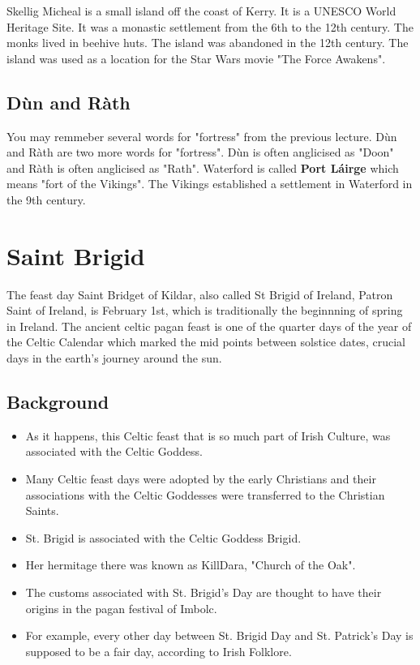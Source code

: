 \documentclass[a4paper]{article}
\begin{document}
Skellig Micheal is a small island off the coast of Kerry. It is a UNESCO World Heritage Site. It was a monastic settlement from the 6th to the 12th century. The monks lived in beehive huts. The island was abandoned in the 12th century. The island was used as a location for the Star Wars movie "The Force Awakens".

\subsection{Dùn and Ràth}

You may remmeber several words for "fortress" from the previous lecture.
Dùn and Ràth are two more words for "fortress". Dùn is often anglicised as "Doon" 
and Ràth is often anglicised as "Rath". Waterford is called \textbf{Port Láirge} which means "fort of the Vikings". The Vikings established a settlement in Waterford in the 9th century.

\section{Saint Brigid}

The feast day Saint Bridget of Kildar, also called St Brigid of Ireland, Patron Saint of Ireland, is February 1st, which is traditionally the beginnning of spring in Ireland.
The ancient celtic pagan feast is one of the quarter days of the year of the Celtic Calendar which marked the mid points between solstice dates, crucial days in the earth's journey around the sun.

\subsection{Background}

\begin{itemize}
    \item As it happens, this Celtic feast that is so much part of Irish Culture, was associated with the Celtic Goddess.
    \item Many Celtic feast days were adopted by the early Christians and their associations with the Celtic Goddesses were transferred to the Christian Saints.
    \item St. Brigid is associated with the Celtic Goddess Brigid.
    \item Her hermitage there was known as KillDara, "Church of the Oak".
    \item The customs associated with St. Brigid's Day are thought to have their origins in the pagan festival of Imbolc.
    \item For example, every other day between St. Brigid Day and St. Patrick's Day is supposed to be a fair day, according to Irish Folklore.
\end{itemize}
\end{document}
